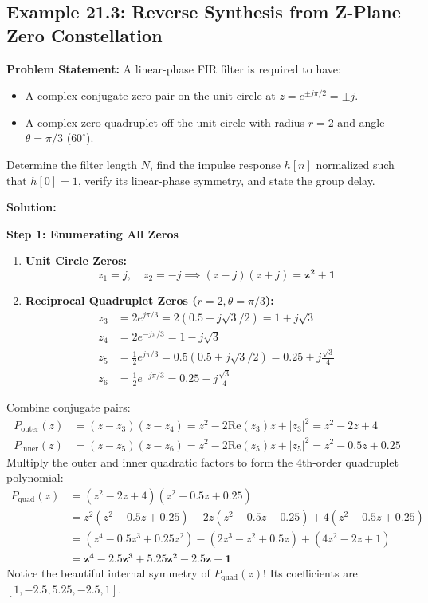 \documentclass[11pt,a4paper]{article}
\begin{document}
\subsection{Example 21.3: Reverse Synthesis from Z-Plane Zero Constellation}
\textbf{Problem Statement:} A linear-phase FIR filter is required to have:
\begin{itemize}
    \item A complex conjugate zero pair on the unit circle at $z = e^{\pm j \pi/2} = \pm j$.
    \item A complex zero quadruplet off the unit circle with radius $r = 2$ and angle $\theta = \pi/3$ ($60^\circ$).
\end{itemize}
Determine the filter length $N$, find the impulse response $h[n]$ normalized such that $h[0] = 1$, verify its linear-phase symmetry, and state the group delay.

\vspace{1mm}
\noindent\textbf{Solution:}

\noindent\textbf{Step 1: Enumerating All Zeros}
\begin{enumerate}
    \item \textbf{Unit Circle Zeros:}
    \begin{equation}
    z_1 = j, \quad z_2 = -j \implies (z - j)(z + j) = \mathbf{z^2 + 1}
    \end{equation}
    \item \textbf{Reciprocal Quadruplet Zeros ($r = 2, \theta = \pi/3$):}
    \begin{align}
    z_3 &= 2 e^{j\pi/3} = 2(0.5 + j\sqrt{3}/2) = 1 + j\sqrt{3} \\
    z_4 &= 2 e^{-j\pi/3} = 1 - j\sqrt{3} \\
    z_5 &= \frac{1}{2} e^{j\pi/3} = 0.5(0.5 + j\sqrt{3}/2) = 0.25 + j\frac{\sqrt{3}}{4} \\
    z_6 &= \frac{1}{2} e^{-j\pi/3} = 0.25 - j\frac{\sqrt{3}}{4}
    \end{align}
\end{enumerate}
Combine conjugate pairs:
\begin{align}
P_{\text{outer}}(z) &= (z - z_3)(z - z_4) = z^2 - 2\mathrm{Re}(z_3)z + |z_3|^2 = z^2 - 2z + 4 \\
P_{\text{inner}}(z) &= (z - z_5)(z - z_6) = z^2 - 2\mathrm{Re}(z_5)z + |z_5|^2 = z^2 - 0.5z + 0.25
\end{align}
Multiply the outer and inner quadratic factors to form the 4th-order quadruplet polynomial:
\begin{align}
P_{\text{quad}}(z) &= (z^2 - 2z + 4)(z^2 - 0.5z + 0.25) \nonumber \\
&= z^2(z^2 - 0.5z + 0.25) - 2z(z^2 - 0.5z + 0.25) + 4(z^2 - 0.5z + 0.25) \nonumber \\
&= (z^4 - 0.5z^3 + 0.25z^2) - (2z^3 - z^2 + 0.5z) + (4z^2 - 2z + 1) \nonumber \\
&= \mathbf{z^4 - 2.5 z^3 + 5.25 z^2 - 2.5 z + 1}
\end{align}
Notice the beautiful internal symmetry of $P_{\text{quad}}(z)$! Its coefficients are $[1, -2.5, 5.25, -2.5, 1]$.
\end{document}
